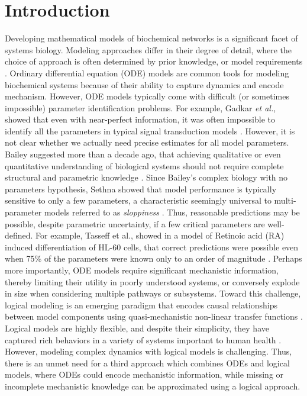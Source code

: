 \documentclass[processes,article,received,moreauthors,pdftex,12pt,a4paper]{mdpi}
\begin{document}
%
\vspace{-12pt}

\section{Introduction}

Developing mathematical models of biochemical networks is a significant facet of systems biology.
Modeling approaches differ in their degree of detail, where the choice of approach is often determined by prior knowledge, or model requirements \citep{2012_kholodenko_kolch_SciSig}. 
Ordinary differential equation (ODE) models are common tools for modeling biochemical systems because of their ability to capture dynamics and encode mechanism.
However, ODE models typically come with difficult (or sometimes impossible) parameter identification problems. 
For example, Gadkar \textit{et al.}, showed that even with near-perfect information, 
it was often impossible to identify all the parameters in typical signal transduction models \citep{Gadkar:2005ad}. 
However, it is not clear whether we actually need precise estimates for all model parameters. 
Bailey suggested more than a decade ago, that achieving qualitative or even quantitative understanding of biological systems 
should not require complete structural and parametric knowledge \citep{2001_bailey_NatBiotech}. 
Since Bailey's complex biology with no parameters hypothesis, Sethna showed that model performance is typically 
sensitive to only a few parameters, a characteristic seemingly universal to multi-parameter models referred to as \textit{sloppiness} \citep{Machta:2013aa}.
Thus, reasonable predictions may be possible, despite parametric uncertainty, if a few critical parameters are well-defined. 
For example, Tasseff et al., showed in a model of Retinoic acid (RA) induced differentiation of HL-60 cells, that correct 
predictions were possible even when 75\% of the parameters were known only to an order of magnitude \citep{Tasseff:2011aa}. 
Perhaps more importantly, ODE models require significant mechanistic information, thereby limiting their utility in poorly understood systems, 
or conversely explode in size when considering multiple pathways or subsystems. 
Toward this challenge, logical modeling is an emerging paradigm that encodes causal relationships between model components using quasi-mechanistic non-linear transfer functions \citep{Morris:2010aa}. 
Logical models are highly flexible, and despite their simplicity, they have captured rich behaviors in a variety of systems important to human health \citep{Saez-Rodriguez:2011aa,Morris:2011ys,Morris:2012aa}. 
However, modeling complex dynamics with logical models is challenging. 
Thus, there is an unmet need for a third approach which combines ODEs and logical models, where ODEs could encode mechanistic information, 
while missing or incomplete mechanistic knowledge can be approximated using a logical approach.  
\end{document}
